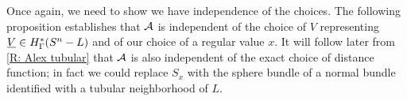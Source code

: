 Once again, we need to show we have independence of the choices.
The following proposition establishes that $\mathcal{A}$ is independent of the choice of $V$ representing $\underline{V} \in H^*_\Gamma(S^n-L)$ and of our choice of a regular value $x$.
It will follow later from \cref{R: Alex tubular} that $\mathcal{A}$ is also independent of the exact choice of distance function; in fact we could replace $S_x$ with the sphere bundle of a normal bundle identified with a tubular neighborhood of $L$.


